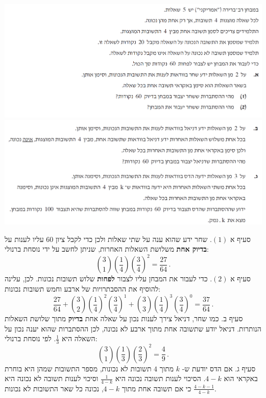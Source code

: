\documentclass[12pt,a4paper]{article}
\begin{document}
\begin{center}
\includegraphics[width=\textwidth]{summer-2018b-3-1}
\includegraphics[width=\textwidth]{summer-2018b-3-2}
\end{center}

סעיף א
$(1)$.
שחר ידע שהוא ענה על שתי שאלות ולכן כדי לקבל ציון
$60$
עליו לענות על 
\textbf{בדיוק אחת}
משלושת השאלות האחרות, שניתן לחשב על ידי נוסחת ברנולי:
\[
{3 \choose 1}\left(\frac{1}{4}\right)\left(\frac{3}{4}\right)^2=\frac{27}{64}\,.
\]
סעיף א
$(2)$.
כדי לעבור את המבחן עליו לצבור
\textbf{לפחות}
שלוש תשובות נכונות. לכן, עלינה להוסיף את ההסבתרויות של ארבע וחמש תשובות נכונות:
\[
\frac{27}{64}+{3 \choose 2}\left(\frac{1}{4}\right)^2\left(\frac{3}{4}\right)^1+{3 \choose 3}\left(\frac{1}{4}\right)^3\left(\frac{3}{4}\right)^0=\frac{37}{64}\,.
\]
סעיף ב.
כמו שחר, דניאל צירך לענות נכון על שאלה אחת 
\textbf{בדיוק}
מתוך שלושת השאלות הנותרות. דניאל יודע שתשובה אחת מתוך ארבע לא נכונה, לכן ההסתברות שהוא יענה נכון על השאלה היא
$\frac{1}{3}$.
לפי נוסחת ברנולי:
\[
{3 \choose 1}\left(\frac{1}{3}\right)\left(\frac{2}{3}\right)^2=\frac{4}{9}\,.
\]
סעיף ג. אם הדס יודעת ש-%
$k$
מתוך 
$4$
תשובות לא נכונות, מספר התשובות שמהן היא בוחרת באקראי הוא
$4-k$.
הסיכוי לענות תשובה נכונה היא
$\frac{1}{4-k}$
וסיכוי לענות תשובה לא נכונה היא
$\frac{4-k-1}{4-k}$
כי אם תשובה אחת מתוך 
$4-k$,
נכונה כל שאר התשובות לא נכונות.
\end{document}
